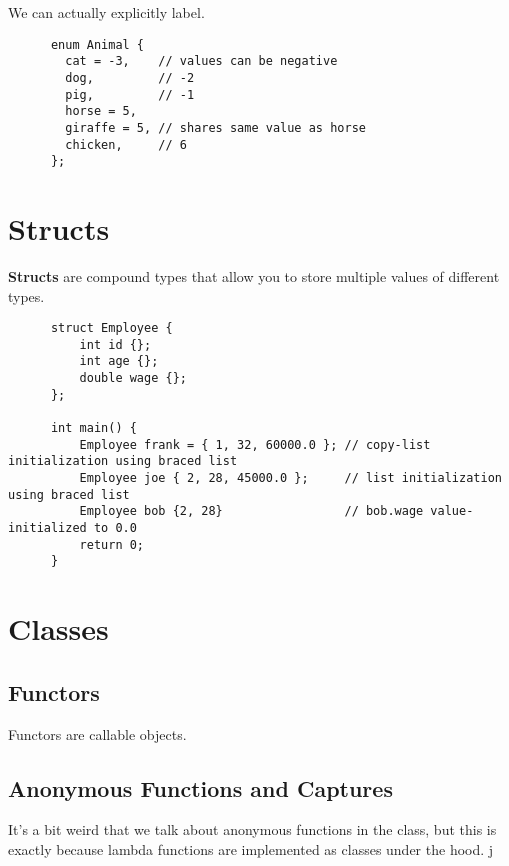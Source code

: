 \documentclass{article}
\begin{document}
  \begin{theorem}
    We can actually explicitly label. 
    \begin{lstlisting}
      enum Animal {
        cat = -3,    // values can be negative
        dog,         // -2
        pig,         // -1
        horse = 5,
        giraffe = 5, // shares same value as horse
        chicken,     // 6
      };
    \end{lstlisting}
  \end{theorem} 

\section{Structs} 

  \begin{definition}[Structs]
    \textbf{Structs} are compound types that allow you to store multiple values of different types. 
    \begin{lstlisting}
      struct Employee {
          int id {};
          int age {};
          double wage {};
      };

      int main() {
          Employee frank = { 1, 32, 60000.0 }; // copy-list initialization using braced list
          Employee joe { 2, 28, 45000.0 };     // list initialization using braced list
          Employee bob {2, 28}                 // bob.wage value-initialized to 0.0
          return 0;
      } 
    \end{lstlisting}
  \end{definition}

\section{Classes} 

  \subsection{Functors} 

    \begin{definition}[Functors]
      Functors are callable objects. 
    \end{definition}

  \subsection{Anonymous Functions and Captures} 

    It's a bit weird that we talk about anonymous functions in the class, but this is exactly because lambda functions are implemented as classes under the hood. j
\end{document}
